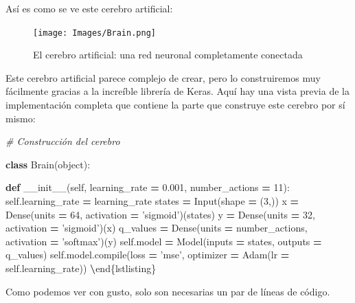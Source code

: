 \documentclass[]{book}
\newenvironment{Shaded}{\begin{snugshade}}{\end{snugshade}}
\newcommand{\BuiltInTok}[1]{#1}
\newcommand{\CommentTok}[1]{\textcolor[rgb]{0.56,0.35,0.01}{\textit{#1}}}
\newcommand{\DecValTok}[1]{\textcolor[rgb]{0.00,0.00,0.81}{#1}}
\newcommand{\FloatTok}[1]{\textcolor[rgb]{0.00,0.00,0.81}{#1}}
\newcommand{\FunctionTok}[1]{\textcolor[rgb]{0.00,0.00,0.00}{#1}}
\newcommand{\KeywordTok}[1]{\textcolor[rgb]{0.13,0.29,0.53}{\textbf{#1}}}
\newcommand{\NormalTok}[1]{#1}
\newcommand{\OperatorTok}[1]{\textcolor[rgb]{0.81,0.36,0.00}{\textbf{#1}}}
\newcommand{\StringTok}[1]{\textcolor[rgb]{0.31,0.60,0.02}{#1}}
\newcommand{\VariableTok}[1]{\textcolor[rgb]{0.00,0.00,0.00}{#1}}
\begin{document}
Así es como se ve este cerebro artificial:

\begin{figure}
\centering
\texttt{[image: Images/Brain.png]}
\caption{El cerebro artificial: una red neuronal completamente conectada}
\end{figure}

Este cerebro artificial parece complejo de crear, pero lo construiremos muy fácilmente gracias a la increíble librería de Keras. Aquí hay una vista previa de la implementación completa que contiene la parte que construye este cerebro por sí mismo:\\

\begin{Shaded}
\begin{Highlighting}[]
\CommentTok{# Construcción del cerebro}

\KeywordTok{class}\NormalTok{ Brain(}\BuiltInTok{object}\NormalTok{):}

    \KeywordTok{def} \FunctionTok{__init__}\NormalTok{(}\VariableTok{self}\NormalTok{, learning_rate }\OperatorTok{=} \FloatTok{0.001}\NormalTok{, number_actions }\OperatorTok{=} \DecValTok{11}\NormalTok{):}
        \VariableTok{self}\NormalTok{.learning_rate }\OperatorTok{=}\NormalTok{ learning_rate}
\NormalTok{        states }\OperatorTok{=}\NormalTok{ Input(shape }\OperatorTok{=}\NormalTok{ (}\DecValTok{3}\NormalTok{,))}
\NormalTok{        x }\OperatorTok{=}\NormalTok{ Dense(units }\OperatorTok{=} \DecValTok{64}\NormalTok{, activation }\OperatorTok{=} \StringTok{'sigmoid'}\NormalTok{)(states)}
\NormalTok{        y }\OperatorTok{=}\NormalTok{ Dense(units }\OperatorTok{=} \DecValTok{32}\NormalTok{, activation }\OperatorTok{=} \StringTok{'sigmoid'}\NormalTok{)(x)}
\NormalTok{        q_values }\OperatorTok{=}\NormalTok{ Dense(units }\OperatorTok{=}\NormalTok{ number_actions, activation }\OperatorTok{=} \StringTok{'softmax'}\NormalTok{)(y)}
        \VariableTok{self}\NormalTok{.model }\OperatorTok{=}\NormalTok{ Model(inputs }\OperatorTok{=}\NormalTok{ states, outputs }\OperatorTok{=}\NormalTok{ q_values)}
        \VariableTok{self}\NormalTok{.model.}\BuiltInTok{compile}\NormalTok{(loss }\OperatorTok{=} \StringTok{'mse'}\NormalTok{, optimizer }\OperatorTok{=}\NormalTok{ Adam(lr }\OperatorTok{=} \VariableTok{self}\NormalTok{.learning_rate))}
\OperatorTok{\textbackslash{}}\NormalTok{end\{lstlisting\}}
\end{Highlighting}
\end{Shaded}

Como podemos ver con gusto, solo son necesarias un par de líneas de código.
\end{document}
